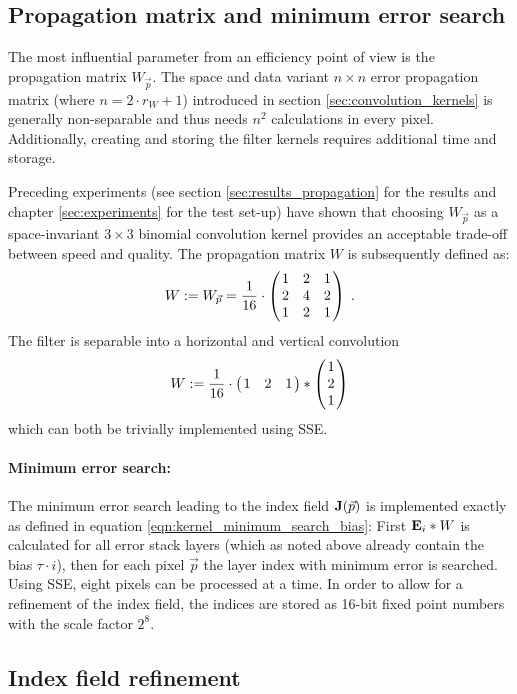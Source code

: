 \subsection{Propagation matrix and minimum error search}

\label{sec:propagation_matrix_choice}

The most influential parameter from an efficiency point of view is the propagation matrix $W_{\vec p}$. The space and data variant $n \times n$ error propagation matrix (where $n = 2 \cdot r_W + 1$) introduced in section \ref{sec:convolution_kernels} is generally non-separable and thus needs $n^2$ calculations in every pixel. Additionally, creating and storing the filter kernels requires additional time and storage.

Preceding experiments (see section \ref{sec:results_propagation} for the results and chapter \ref{sec:experiments} for the test set-up) have shown that choosing $W_{\vec p}$ as a space-invariant $3 \times 3$ binomial convolution kernel provides an acceptable trade-off between speed and quality. The propagation matrix $W$ is subsequently defined as:
  $$W := W_{\vec p} = \frac{1}{16} \cdot \begmat 1 & 2 & 1 \\ 2 & 4 & 2 \\ 1 & 2 & 1 \finmat \; .$$
The filter is separable into a horizontal and vertical convolution
  $$W := \frac{1}{16} \cdot \left( \left. \begin{matrix} 1 & 2 & 1 \end{matrix}\right. \right) \ast \left( \left. \begin{matrix} 1 \\ 2 \\ 1 \end{matrix}\right. \right)$$
which can both be trivially implemented using SSE.

\paragraph{Minimum error search:} The minimum error search leading to the index field $\img{J}(\vec p)$ is implemented exactly as defined in equation \ref{eqn:kernel_minimum_search_bias}: First $\mathbf{E}_i \ast W$ is calculated for all error stack layers (which as noted above already contain the bias $\tau \cdot i$), then for each pixel $\vec p$ the layer index with minimum error is searched. Using SSE, eight pixels can be processed at a time. In order to allow for a refinement of the index field, the indices are stored as 16-bit fixed point numbers with the scale factor $2^8$.

\subsection{Index field refinement}

